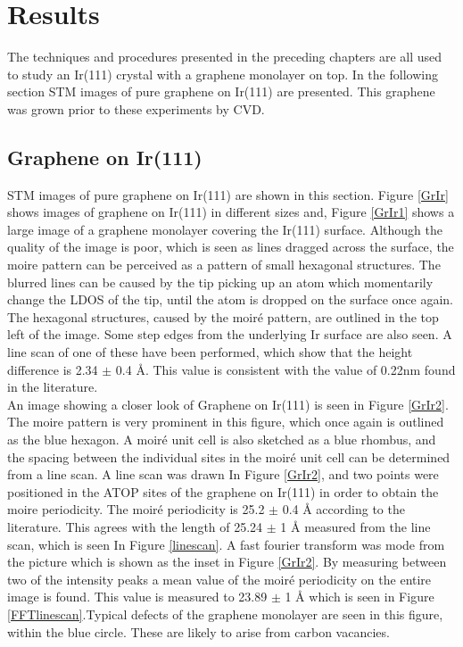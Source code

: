 \chapter{Results}
\label{cha:results}

The techniques and procedures presented in the preceding chapters are all used to study an Ir(111) crystal with a graphene monolayer on top. In the following section STM images of pure graphene on Ir(111) are presented. This graphene was grown prior to these experiments by CVD.

\section{Graphene on Ir(111)}

STM images of pure graphene on Ir(111) are shown in this section. Figure \ref{GrIr} shows images of graphene on Ir(111) in different sizes and, Figure \ref{GrIr1} shows a large image of a graphene monolayer covering the Ir(111) surface. Although the quality of the image is poor, which is seen as lines dragged across the surface, the moire pattern can be perceived as a pattern of small hexagonal structures. The blurred lines can be caused by the tip picking up an atom which momentarily change the LDOS of the tip, until the atom is dropped on the surface once again. The hexagonal structures, caused by the moiré pattern, are outlined in the top left of the image. Some step edges from the underlying Ir surface are also seen. A line scan of one of these have been performed, which show that the height difference is 2.34 $\pm$ 0.4 Å. This value is consistent with the value of 0.22nm found in the literature.\cite{1367-2630-11-2-023006,coraux2008structural}\\
An image showing a closer look of Graphene on Ir(111) is seen in Figure \ref{GrIr2}. The moire pattern is very prominent in this figure, which once again is outlined as the blue hexagon. A moiré unit cell is also sketched as a blue rhombus, and the spacing between the individual sites in the moiré unit cell can be determined from a line scan. A line scan was drawn In Figure \ref{GrIr2}, and two points were positioned in the ATOP sites of the graphene on Ir(111) in order to obtain the moire periodicity. The moiré periodicity is 25.2 $\pm$ 0.4 Å according to the literature.\cite{1367-2630-10-4-043033} This agrees with the length of 25.24 $\pm$ 1 Å measured from the line scan, which is seen In Figure \ref{linescan}. A fast fourier transform was mode from the picture which is shown as the inset in Figure \ref{GrIr2}. By measuring between two of the intensity peaks a mean value of the moiré periodicity on the entire image is found. This value is measured to 23.89 $\pm$ 1 Å which is seen in Figure \ref{FFTlinescan}.Typical defects of the graphene monolayer are seen in this figure, within the blue circle. These are likely to arise from carbon vacancies.\\
